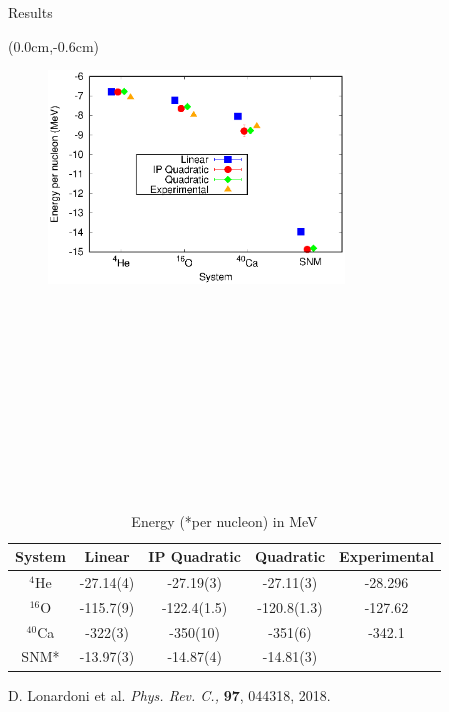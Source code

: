 \documentclass{beamer}
\begin{document}
\begin{frame}{Results}
\begin{textblock*}{\textwidth}(0.0cm,-0.6cm) %
\begin{figure}[h]
   \centering
   \includegraphics[width=0.7\textwidth]{figures/energy.eps}
\end{figure}
\end{textblock*}
~\\~\\~\\~\\~\\~\\~\\~\\
~\\~\\
\tiny
\begin{table}[htb]
\centering
\caption[]{Energy (*per nucleon) in MeV}
\begin{tabular}{ccccc}
\hline\hline
System & Linear & IP Quadratic & Quadratic & Experimental\\
\hline
${}^{4}${He}   & -27.14(4) & -27.19(3)    & -27.11(3)    & -28.296   \\
${}^{16}${O}   & -115.7(9) & -122.4(1.5)  & -120.8(1.3)  & -127.62   \\
${}^{40}${Ca}  & -322(3)   & -350(10)     & -351(6)      & -342.1    \\
SNM*           & -13.97(3) & -14.87(4)    & -14.81(3)    &           \\
\hline\hline
\end{tabular}
\label{tab:psi2}
\end{table}
{\tiny D. Lonardoni et al. \textit{Phys. Rev. C.,} \textbf{97}, 044318, 2018.}
\end{frame}
\end{document}
